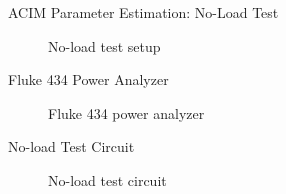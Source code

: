 \begin{frame}{ACIM Parameter Estimation: No-Load Test}
	\begin{figure}
		\centering


		\caption{No-load test setup}
	\end{figure}
\end{frame}

\begin{frame}{Fluke 434 Power Analyzer}
	\begin{figure}
		\centering


		\caption{Fluke 434 power analyzer}
	\end{figure}
\end{frame}

\begin{frame}{No-load Test Circuit}
	\begin{figure}
		\centering


		\caption{No-load test circuit}
	\end{figure}
\end{frame}

